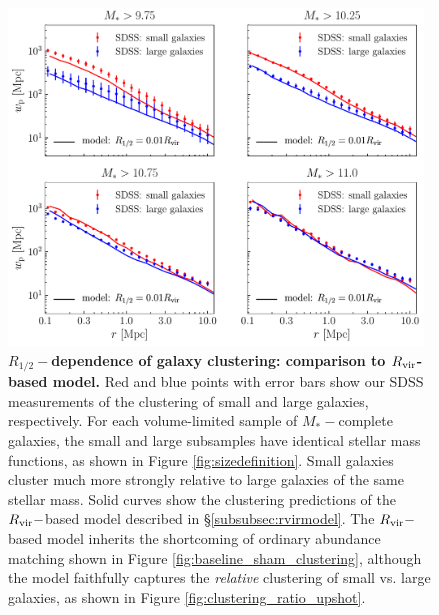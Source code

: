 \documentclass[usenatbib,usegraphicx,letterpaper]{mn2e}
\newcommand{\rhalf}{R_{1/2}}
\newcommand{\mstar}{M_{\ast}}
\newcommand{\rvir}{R_{\rm vir}}
\begin{document}
\begin{figure}
\centering
\includegraphics[width=11cm]{FIGS/rvir_only_wp_large_small_absolute.pdf}
\caption{
{\bf $\rhalf-$dependence of galaxy clustering: comparison to $\rvir$-based model.}
Red and blue points with error bars show our SDSS measurements of the clustering of small and large galaxies, respectively. For each volume-limited sample of $\mstar-$complete galaxies, the small and large subsamples have identical stellar mass functions, as shown in Figure \ref{fig:sizedefinition}. Small galaxies cluster much more strongly relative to large galaxies of the same stellar mass. Solid curves show the clustering predictions of the $\rvir-$based model described in \S\ref{subsubsec:rvirmodel}. The $\rvir-$based model inherits the shortcoming of ordinary abundance matching shown in Figure \ref{fig:baseline_sham_clustering}, although the model faithfully captures the {\em relative} clustering of small vs. large galaxies, as shown in Figure \ref{fig:clustering_ratio_upshot}.
}
\label{fig:rvir_only_clustering_absolute}
\end{figure}
\end{document}
